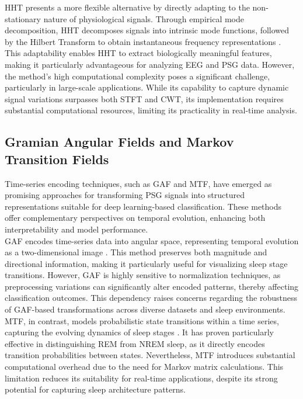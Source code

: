 HHT presents a more flexible alternative by directly adapting to the non-stationary nature of physiological signals. Through empirical mode decomposition, HHT decomposes signals into intrinsic mode functions, followed by the Hilbert Transform to obtain instantaneous frequency representations \parencite{huang1998empirical}. This adaptability enables HHT to extract biologically meaningful features, making it particularly advantageous for analyzing EEG and PSG data. However, the method's high computational complexity poses a significant challenge, particularly in large-scale applications. While its capability to capture dynamic signal variations surpasses both STFT and CWT, its implementation requires substantial computational resources, limiting its practicality in real-time analysis.

\subsection{Gramian Angular Fields and Markov Transition Fields}

Time-series encoding techniques, such as \ac{GAF} and \ac{MTF}, have emerged as promising approaches for transforming PSG signals into structured representations suitable for deep learning-based classification. These methods offer complementary perspectives on temporal evolution, enhancing both interpretability and model performance. \\

GAF encodes time-series data into angular space, representing temporal evolution as a two-dimensional image \parencite{wang2015imaging}. This method preserves both magnitude and directional information, making it particularly useful for visualizing sleep stage transitions. However, GAF is highly sensitive to normalization techniques, as preprocessing variations can significantly alter encoded patterns, thereby affecting classification outcomes. This dependency raises concerns regarding the robustness of GAF-based transformations across diverse datasets and sleep environments. \\

MTF, in contrast, models probabilistic state transitions within a time series, capturing the evolving dynamics of sleep stages \parencite{wang2015imaging}. It has proven particularly effective in distinguishing REM from NREM sleep, as it directly encodes transition probabilities between states. Nevertheless, MTF introduces substantial computational overhead due to the need for Markov matrix calculations. This limitation reduces its suitability for real-time applications, despite its strong potential for capturing sleep architecture patterns. \\

